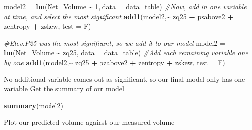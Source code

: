 \documentclass[
]{book}
\newenvironment{Shaded}{\begin{snugshade}}{\end{snugshade}}
\newcommand{\AttributeTok}[1]{\textcolor[rgb]{0.13,0.29,0.53}{#1}}
\newcommand{\CommentTok}[1]{\textcolor[rgb]{0.56,0.35,0.01}{\textit{#1}}}
\newcommand{\DecValTok}[1]{\textcolor[rgb]{0.00,0.00,0.81}{#1}}
\newcommand{\FunctionTok}[1]{\textcolor[rgb]{0.13,0.29,0.53}{\textbf{#1}}}
\newcommand{\NormalTok}[1]{#1}
\newcommand{\OtherTok}[1]{\textcolor[rgb]{0.56,0.35,0.01}{#1}}
\newcommand{\SpecialCharTok}[1]{\textcolor[rgb]{0.81,0.36,0.00}{\textbf{#1}}}
\newcommand{\StringTok}[1]{\textcolor[rgb]{0.31,0.60,0.02}{#1}}
\begin{document}
\begin{Shaded}
\begin{Highlighting}[]
\NormalTok{model2 }\OtherTok{=} \FunctionTok{lm}\NormalTok{(Net\_Volume }\SpecialCharTok{\textasciitilde{}} \DecValTok{1}\NormalTok{, }\AttributeTok{data =}\NormalTok{ data\_table)}
\CommentTok{\#Now, add in one variable at time, and select the most significant}
\FunctionTok{add1}\NormalTok{(model2,}\SpecialCharTok{\textasciitilde{}}\NormalTok{ zq25 }\SpecialCharTok{+}\NormalTok{ pzabove2 }\SpecialCharTok{+}\NormalTok{ zentropy }\SpecialCharTok{+}\NormalTok{ zskew, }\AttributeTok{test =} \StringTok{\textquotesingle{}F\textquotesingle{}}\NormalTok{)}

\CommentTok{\#Elev.P25 was the most significant, so we add it to our model}
\NormalTok{model2 }\OtherTok{=} \FunctionTok{lm}\NormalTok{(Net\_Volume }\SpecialCharTok{\textasciitilde{}}\NormalTok{ zq25, }\AttributeTok{data =}\NormalTok{ data\_table)}
\CommentTok{\#Add each remaining variable one by one}
\FunctionTok{add1}\NormalTok{(model2,}\SpecialCharTok{\textasciitilde{}}\NormalTok{ zq25 }\SpecialCharTok{+}\NormalTok{ pzabove2 }\SpecialCharTok{+}\NormalTok{ zentropy }\SpecialCharTok{+}\NormalTok{ zskew, }\AttributeTok{test =} \StringTok{\textquotesingle{}F\textquotesingle{}}\NormalTok{)}
\end{Highlighting}
\end{Shaded}

No additional variable comes out as significant, so our final model only has one variable Get the summary of our model

\begin{Shaded}
\begin{Highlighting}[]
\FunctionTok{summary}\NormalTok{(model2)}
\end{Highlighting}
\end{Shaded}

Plot our predicted volume against our measured volume

\begin{Shaded}
\end{Shaded}
\end{document}
